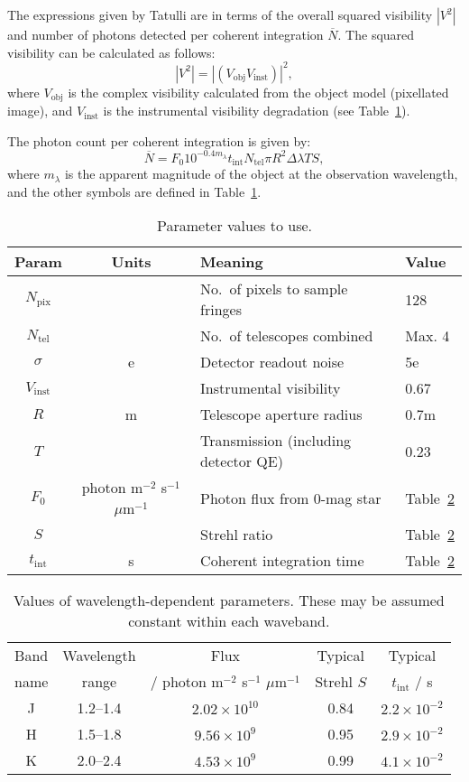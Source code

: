 \documentclass{article}
\begin{document}
The expressions given by Tatulli are in terms of the overall squared
visibility $|V^2|$ and number of photons detected per coherent
integration $\overline{N}$. The squared visibility can be calculated
as follows:
\begin{equation}
|V^2| = | \left( V_\mathrm{obj} V_\mathrm{inst} \right) |^2  ,
\end{equation}
where $V_\mathrm{obj}$ is the complex visibility calculated from the
object model (pixellated image), and $V_\mathrm{inst}$ is the
instrumental visibility degradation (see Table~\ref{tab:params}).

The photon count per coherent integration is given by:
\begin{equation}
\overline{N} = F_0 10^{-0.4m_\lambda} t_\mathrm{int} N_\mathrm{tel} \pi R^2
\Delta\!\lambda T S  ,
\end{equation}
where $m_\lambda$ is the apparent magnitude of the object at the
observation wavelength, and the other symbols are defined in
Table~\ref{tab:params}.

\begin{table}[p]
\caption{\label{tab:params} Parameter values to use.}
\begin{tabular}{ccll}
\hline
Param & Units & Meaning & Value\\
\hline
$N_\mathrm{pix}$ & & No.\ of pixels to sample fringes & 128 \\
$N_\mathrm{tel}$ & & No.\ of telescopes combined & Max. 4\\
$\sigma$ & e & Detector readout noise & 5e \\
$V_\mathrm{inst}$ & & Instrumental visibility & 0.67 \\
$R$ & m & Telescope aperture radius & 0.7m \\
$T$ & & Transmission (including detector QE) & 0.23 \\
$F_0$ & photon m$^{-2}$ s$^{-1}$ $\mu$m$^{-1}$
 & Photon flux from 0-mag star & Table~\ref{tab:wav_dep} \\
$S$ & & Strehl ratio & Table~\ref{tab:wav_dep} \\
$t_\mathrm{int}$ & s & Coherent integration time & Table~\ref{tab:wav_dep} \\
\hline
\end{tabular}
\end{table}

\begin{table}[p]
\caption{\label{tab:wav_dep} Values of wavelength-dependent
  parameters. These may be assumed constant within each waveband.}
\begin{tabular}{ccccc}
\hline
Band & Wavelength & Flux & Typical & Typical \\
name & range & / photon m$^{-2}$ s$^{-1}$ $\mu$m$^{-1}$
 & Strehl $S$ & $t_\mathrm{int}$ / s\\
\hline
J & 1.2--1.4 & $2.02 \times 10^{10}$ & 0.84 & $2.2 \times 10^{-2}$ \\
H & 1.5--1.8 & $9.56 \times 10^{9}$  & 0.95 & $2.9 \times 10^{-2}$ \\
K & 2.0--2.4 & $4.53 \times 10^{9}$  & 0.99 & $4.1 \times 10^{-2}$\\
\hline
\end{tabular}
\end{table}
\end{document}
